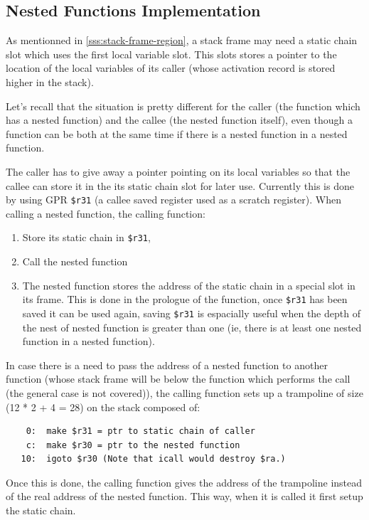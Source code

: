 \subsection{Nested Functions Implementation}

As mentionned in \ref{sss:stack-frame-region}, a stack frame may need a static
chain slot which uses the first local variable slot. This slots stores a
pointer to the location of the local variables of its caller (whose activation
record is stored higher in the stack).

Let's recall that the situation is pretty different for the caller (the
function which has a nested function) and the callee (the nested function
itself), even though a function can be both at the same time if there is a
nested function in a nested function.

The caller has to give away a pointer pointing on its local variables so that
the callee can store it in the its static chain slot for later use. Currently
this is done by using GPR \texttt{\$r31} (a callee saved register used as a
scratch register). When calling a nested function, the calling function:
\begin{enumerate}
    \item Store its static chain in \texttt{\$r31},
    \item Call the nested function
    \item The nested function stores the address of the static chain in a
          special slot in its frame. This is done in the prologue of the function, once
          \texttt{\$r31} has been saved it can be used again, saving \texttt{\$r31} is
          espacially useful when the depth of the nest of nested function is greater than
          one (ie, there is at least one nested function in a nested function).
\end{enumerate}

In case there is a need to pass the address of a nested function to another
function (whose stack frame will be below the function which performs the call
(the general case is not covered)), the calling function sets up a trampoline
of size (12 * 2 + 4 = 28) on the stack composed of:

\begin{verbatim}
    0:  make $r31 = ptr to static chain of caller
    c:  make $r30 = ptr to the nested function
   10:  igoto $r30 (Note that icall would destroy $ra.)
\end{verbatim}

Once this is done, the calling function gives the address of the trampoline
instead of the real address of the nested function. This way, when it is called
it first setup the static chain.

